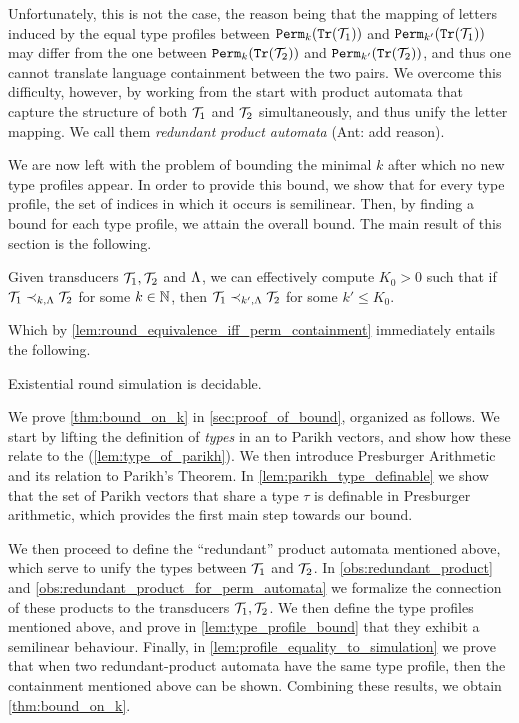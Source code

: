 Unfortunately, this is not the case, the reason being
that the mapping of letters induced by the equal type profiles between ${\mathtt{Perm}}_k({\mathtt{Tr}}(\mathcal{T}_1))$ and ${\mathtt{Perm}}_{k'}({\mathtt{Tr}}(\mathcal{T}_1))$ may differ from the one between ${\mathtt{Perm}}_k({\mathtt{Tr}}(\mathcal{T}_2))$ and ${\mathtt{Perm}}_{k'}({\mathtt{Tr}}(\mathcal{T}_2))$, and thus one cannot translate language containment between the two pairs. We overcome this difficulty, however, by working from the start with product automata that capture the structure of both $\mathcal{T}_1$ and $\mathcal{T}_2$ simultaneously, and thus unify the letter mapping. We call them \emph{redundant product automata} (Ant: add reason). 

We are now left with the problem of bounding the minimal $k$ after which 
no new type profiles appear.
In order to provide this bound, we show that for every type profile, the set of indices in which it occurs is semilinear. Then, by finding a bound for each type profile, we attain the overall bound. 
The main result of this section is the following.
\begin{theorem}
\label{thm:bound_on_k}	
	Given transducers $\mathcal{T}_1,\mathcal{T}_2$ and $\Lambda$, we can effectively compute $K_0>0$ such that if $\mathcal{T}_1\prec_{k,\Lambda} \mathcal{T}_2$ for some $k\in \mathbb{N}$, then $\mathcal{T}_1\prec_{k',\Lambda} \mathcal{T}_2$ for some $k'\le K_0$.
\end{theorem}
Which by \autoref{lem:round_equivalence_iff_perm_containment} immediately entails the following.
\begin{corollary}
\label{cor:exist_k_decidable}
Existential round simulation is decidable.
\end{corollary}

We prove \autoref{thm:bound_on_k} in \autoref{sec:proof_of_bound}, organized as follows. We start by lifting the definition of \emph{types} in an \NFA to Parikh vectors, and show how these relate to the \NFA (\autoref{lem:type_of_parikh}). We then introduce Presburger Arithmetic and its relation to Parikh's Theorem. In \autoref{lem:parikh_type_definable} we show that the set of Parikh vectors that share a type $\tau$ is definable in Presburger arithmetic, which provides the first main step towards our bound.

We then proceed to define the ``redundant'' product automata mentioned above, which serve to unify the types between $\mathcal{T}_1$ and $\mathcal{T}_2$. In \autoref{obs:redundant_product} and \autoref{obs:redundant_product_for_perm_automata} we formalize the connection of these products to the transducers $\mathcal{T}_1,\mathcal{T}_2$. We then define the type profiles mentioned above, and prove in \autoref{lem:type_profile_bound} that they exhibit a semilinear behaviour. Finally, in \autoref{lem:profile_equality_to_simulation} we prove that when two redundant-product automata have the same type profile, then the containment mentioned above can be shown. Combining these results, we obtain \autoref{thm:bound_on_k}.

